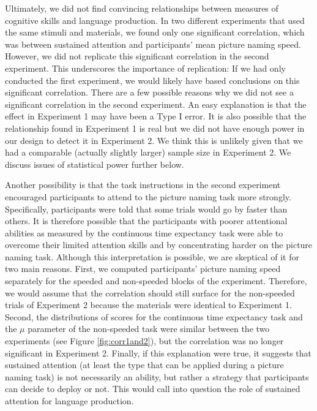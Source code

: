 \documentclass[
  man,floatsintext]{apa6}
\begin{document}
Ultimately, we did not find convincing relationships between measures of cognitive skills and language production. In two different experiments that used the same stimuli and materials, we found only one significant correlation, which was between sustained attention and participants' mean picture naming speed. However, we did not replicate this significant correlation in the second experiment. This underscores the importance of replication: If we had only conducted the first experiment, we would likely have based conclusions on this significant correlation. There are a few possible reasons why we did not see a significant correlation in the second experiment. An easy explanation is that the effect in Experiment 1 may have been a Type I error. It is also possible that the relationship found in Experiment 1 is real but we did not have enough power in our design to detect it in Experiment 2. We think this is unlikely given that we had a comparable (actually slightly larger) sample size in Experiment 2. We discuss issues of statistical power further below.

Another possibility is that the task instructions in the second experiment encouraged participants to attend to the picture naming task more strongly. Specifically, participants were told that some trials would go by faster than others. It is therefore possible that the participants with poorer attentional abilities as measured by the continuous time expectancy task were able to overcome their limited attention skills and by concentrating harder on the picture naming task. Although this interpretation is possible, we are skeptical of it for two main reasons. First, we computed participants' picture naming speed separately for the speeded and non-speeded blocks of the experiment. Therefore, we would assume that the correlation should still surface for the non-speeded trials of Experiment 2 because the materials were identical to Experiment 1. Second, the distributions of scores for the continuous time expectancy task and the \(\mu\) parameter of the non-speeded task were similar between the two experiments (see Figure \ref{fig:corr1and2}), but the correlation was no longer significant in Experiment 2. Finally, if this explanation were true, it suggests that sustained attention (at least the type that can be applied during a picture naming task) is not necessarily an ability, but rather a strategy that participants can decide to deploy or not. This would call into question the role of sustained attention for language production.
\end{document}
